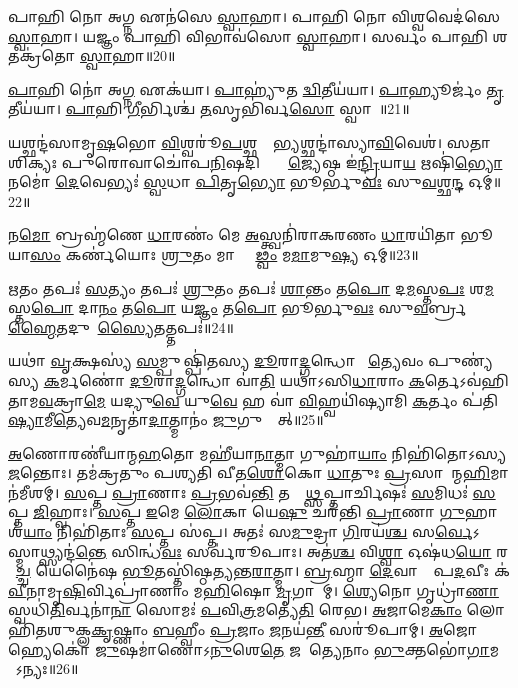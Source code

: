 𑌪𑌾𑌹𑌿 𑌨𑍋 𑌅𑌗𑍍𑌨 𑌏𑌨॑𑌸𑍇 \ul{𑌸𑍍𑌵𑌾}𑌹𑌾। 
𑌪𑌾𑌹𑌿 𑌨𑍋 𑌵𑌿𑌶𑍍𑌵𑌵𑍇𑌦॑𑌸𑍇 \ul{𑌸𑍍𑌵𑌾}𑌹𑌾। 
𑌯𑌜𑍍𑌞𑌂 𑌪𑌾𑌹𑌿 𑌵𑌿𑌭𑌾𑌵॑𑌸𑍋 \ul{𑌸𑍍𑌵𑌾}𑌹𑌾। 
𑌸𑌰𑍍𑌵𑌂 𑌪𑌾𑌹𑌿 𑌶𑌤𑌕𑍍𑌰॑𑌤𑍋 \ul{𑌸𑍍𑌵𑌾}𑌹𑌾॥20॥
\anuvakamend

\ul{𑌪𑌾}𑌹𑌿 𑌨𑍋॑ 𑌅\ul{𑌗𑍍𑌨} 𑌏𑌕॑𑌯𑌾। 
\ul{𑌪𑌾}𑌹𑍍𑌯𑍁॑𑌤 \ul{𑌦𑍍𑌵𑌿}𑌤𑍀𑌯॑𑌯𑌾। 
\ul{𑌪𑌾}𑌹𑍍𑌯𑍂𑌰𑍍𑌜𑌂॑ \ul{𑌤𑍃}𑌤𑍀𑌯॑𑌯𑌾। 
\ul{𑌪𑌾}𑌹𑌿 \ul{𑌗𑍀}𑌰𑍍𑌭𑌿𑌶𑍍𑌚॑ \ul{𑌤}𑌸𑍃𑌭𑌿॑𑌰𑍍𑌵\ul{𑌸𑍋} 𑌸𑍍𑌵𑌾𑌹𑌾᳚॥21॥
\anuvakamend

𑌯𑌶𑍍𑌛𑌨𑍍𑌦॑𑌸𑌾𑌮𑍃\ul{𑌷}𑌭𑍋 \ul{𑌵𑌿}𑌶𑍍𑌵𑌰𑍂॑\ul{𑌪}𑌶𑍍𑌛𑌨𑍍𑌦𑍋᳚\ul{𑌭𑍍𑌯}𑌶𑍍𑌛𑌨𑍍𑌦𑌾॑𑌸𑍍𑌯𑌾\ul{𑌵𑌿}𑌵𑍇𑌶॑। 
𑌸𑌤𑌾 𑌶𑌿𑌕𑍍𑌯𑌃 𑌪𑍁𑌰𑍋𑌵𑌾𑌚𑍋॑𑌪\ul{𑌨𑌿}𑌷𑌦𑌿𑌨𑍍𑌦𑍍𑌰𑍋᳚ \ul{𑌜𑍍𑌯𑍇}𑌷𑍍𑌠 𑌇॑\ul{𑌨𑍍𑌦𑍍𑌰𑌿}𑌯𑌾\ul{𑌯} 𑌋𑌷𑌿॑\ul{𑌭𑍍𑌯𑍋} 𑌨𑌮𑍋॑ \ul{𑌦𑍇}𑌵𑍇𑌭𑍍𑌯𑌃॑ \ul{𑌸𑍍𑌵}𑌧𑌾 \ul{𑌪𑌿}𑌤𑍃\ul{𑌭𑍍𑌯𑍋} 𑌭𑍂𑌰𑍍𑌭𑍁\ul{𑌵𑌃} 𑌸𑍁\ul{𑌵}𑌶𑍍𑌛\ul{𑌨𑍍𑌦} 𑌓𑌮𑍍॥22॥
\anuvakamend


𑌨\ul{𑌮𑍋} 𑌬𑍍𑌰𑌹𑍍𑌮॑𑌣𑍇 \ul{𑌧𑌾}𑌰𑌣𑌂॑ 𑌮𑍇 \ul{𑌅}𑌸𑍍𑌤𑍍𑌵𑌨𑌿॑𑌰𑌾𑌕𑌰𑌣𑌂 \ul{𑌧𑌾}𑌰𑌯𑌿॑𑌤𑌾 𑌭𑍂𑌯𑌾\ul{𑌸𑌂} 𑌕𑌰𑍍𑌣॑𑌯𑍋𑌃 \ul{𑌶𑍍𑌰𑍁}𑌤𑌂 𑌮𑌾 𑌚𑍍𑌯𑍋᳚\ul{𑌢𑍍𑌵𑌂} 𑌮\ul{𑌮𑌾}𑌮𑍁\ul{𑌷𑍍𑌯} 𑌓𑌮𑍍॥23॥
\anuvakamend

\ul{𑌋}𑌤𑌂 𑌤𑌪𑌃॑ \ul{𑌸}𑌤𑍍𑌯𑌂 𑌤𑌪𑌃॑ \ul{𑌶𑍍𑌰𑍁}𑌤𑌂 𑌤𑌪𑌃॑ \ul{𑌶𑌾}𑌨𑍍𑌤𑌂 𑌤\ul{𑌪𑍋} 𑌦\ul{𑌮}𑌸𑍍𑌤\ul{𑌪𑌃} 𑌶\ul{𑌮}𑌸𑍍𑌤\ul{𑌪𑍋} 𑌦𑌾\ul{𑌨𑌂} 𑌤\ul{𑌪𑍋} 𑌯\ul{𑌜𑍍𑌞𑌂} 𑌤\ul{𑌪𑍋} 𑌭𑍂𑌰𑍍𑌭𑍁\ul{𑌵𑌃} 𑌸𑍁\ul{𑌵}𑌰𑍍𑌬𑍍𑌰\ul{𑌹𑍍𑌮𑍈}𑌤𑌦𑍁𑌪𑌾᳚\ul{𑌸𑍍𑌯𑍈}𑌤𑌤𑍍𑌤𑌪𑌃॑॥24॥
\anuvakamend


𑌯𑌥𑌾॑ \ul{𑌵𑍃}𑌕𑍍𑌷𑌸𑍍𑌯॑ \ul{𑌸}𑌮𑍍𑌪𑍁𑌷𑍍𑌪𑌿॑𑌤𑌸𑍍𑌯 \ul{𑌦𑍂}𑌰𑌾\ul{𑌦𑍍𑌗}𑌨𑍍𑌧𑍋 𑌵𑌾᳚\ul{𑌤𑍍𑌯𑍇}𑌵𑌂 𑌪𑍁𑌣𑍍𑌯॑𑌸𑍍𑌯 \ul{𑌕}𑌰𑍍𑌮𑌣𑍋॑ \ul{𑌦𑍂}𑌰𑌾\ul{𑌦𑍍𑌗}𑌨𑍍𑌧𑍋 𑌵𑌾॑\ul{𑌤𑌿} 𑌯𑌥𑌾॑𑌽𑌸𑌿\ul{𑌧𑌾}𑌰𑌾𑌂 \ul{𑌕}𑌰𑍍𑌤𑍇𑌽𑌵॑𑌹𑌿𑌤𑌾𑌮\ul{𑌵}𑌕𑍍𑌰𑌾\ul{𑌮𑍇} 𑌯𑌦𑍍𑌯𑍁\ul{𑌵𑍇} 𑌯𑍁\ul{𑌵𑍇} 𑌹 𑌵𑌾॑ \ul{𑌵𑌿}𑌹𑍍𑌵𑌯𑌿॑𑌷𑍍𑌯𑌾𑌮𑌿 \ul{𑌕}𑌰𑍍𑌤𑌂 𑌪॑𑌤𑌿\ul{𑌷𑍍𑌯𑌾}𑌮𑍀\ul{𑌤𑍍𑌯𑍇}𑌵\ul{𑌮}𑌨𑍃𑌤𑌾॑\ul{𑌦𑌾}𑌤𑍍𑌮𑌾𑌨𑌂॑ \ul{𑌜𑍁}𑌗𑍁𑌫𑍍𑌸𑍇᳚𑌤𑍍॥25॥
\anuvakamend


\ul{𑌅}𑌣𑍋𑌰𑌣𑍀॑𑌯𑌾𑌨𑍍𑌮\ul{𑌹}𑌤𑍋 𑌮𑌹𑍀॑𑌯𑌾\ul{𑌨𑌾}𑌤𑍍𑌮𑌾 𑌗𑍁𑌹𑌾॑\ul{𑌯𑌾𑌂} 𑌨𑌿𑌹𑌿॑𑌤𑍋𑌽𑌸𑍍𑌯 \ul{𑌜}𑌨𑍍𑌤𑍋𑌃। 
𑌤𑌮॑𑌕𑍍𑌰𑌤𑍁𑌂 𑌪𑌶𑍍𑌯𑌤𑌿 𑌵𑍀𑌤\ul{𑌶𑍋}𑌕𑍋 \ul{𑌧𑌾}𑌤𑍁𑌃 \ul{𑌪𑍍𑌰}𑌸𑌾𑌦𑌾᳚𑌨𑍍𑌮\ul{𑌹𑌿}𑌮𑌾𑌨॑\-𑌮𑍀𑌶𑌮𑍍। 
\ul{𑌸}𑌪𑍍𑌤 \ul{𑌪𑍍𑌰𑌾}𑌣𑌾𑌃 \ul{𑌪𑍍𑌰}𑌭𑌵॑\ul{𑌨𑍍𑌤𑌿} 𑌤𑌸𑍍𑌮𑌾᳚\ul{𑌥𑍍𑌸}𑌪𑍍𑌤𑌾𑌰𑍍𑌚𑌿𑌷𑌃॑ \ul{𑌸}𑌮𑌿𑌧𑌃॑ \ul{𑌸}𑌪𑍍𑌤 \ul{𑌜𑌿}𑌹𑍍𑌵𑌾𑌃। 
\ul{𑌸}𑌪𑍍𑌤 \ul{𑌇}𑌮𑍇 \ul{𑌲𑍋}𑌕𑌾 𑌯𑍇\ul{𑌷𑍁} 𑌚𑌰॑𑌨𑍍𑌤𑌿 \ul{𑌪𑍍𑌰𑌾}𑌣𑌾 \ul{𑌗𑍁}𑌹𑌾𑌶॑\ul{𑌯𑌾𑌂} 𑌨𑌿𑌹𑌿॑𑌤𑌾𑌃 \ul{𑌸}𑌪𑍍𑌤 𑌸॑𑌪𑍍𑌤। 
𑌅𑌤𑌃॑ 𑌸\ul{𑌮𑍁}𑌦𑍍𑌰𑌾 \ul{𑌗𑌿}𑌰𑌯॑\ul{𑌶𑍍𑌚} 𑌸\ul{𑌰𑍍𑌵𑍇}𑌽𑌸𑍍𑌮𑌾𑌥𑍍𑌸𑍍𑌯𑌨𑍍𑌦॑\ul{𑌨𑍍𑌤𑍇} 𑌸𑌿𑌨𑍍𑌧॑\ul{𑌵𑌃} 𑌸𑌰𑍍𑌵॑𑌰𑍂𑌪𑌾𑌃। 
𑌅𑌤॑\ul{𑌶𑍍𑌚} 𑌵𑌿\ul{𑌶𑍍𑌵𑌾} 𑌓𑌷॑𑌧\ul{𑌯𑍋} 𑌰𑌸𑌾᳚\ul{𑌚𑍍𑌚} 𑌯𑍇𑌨𑍈॑𑌷 \ul{𑌭𑍂}𑌤𑌸𑍍𑌤𑌿॑𑌷𑍍𑌠𑌤𑍍𑌯𑌨𑍍𑌤\ul{𑌰𑌾}𑌤𑍍𑌮𑌾। 
\ul{𑌬𑍍𑌰}𑌹𑍍𑌮𑌾 \ul{𑌦𑍇}𑌵𑌾𑌨𑌾𑌂᳚ 𑌪\ul{𑌦}𑌵𑍀𑌃 𑌕॑\ul{𑌵𑍀}𑌨𑌾𑌮𑍃\ul{𑌷𑌿}𑌰𑍍𑌵𑌿𑌪𑍍𑌰𑌾॑𑌣𑌾𑌂 𑌮\ul{𑌹𑌿}𑌷𑍋 \ul{𑌮𑍃}𑌗𑌾𑌣𑌾᳚𑌮𑍍। 
\ul{𑌶𑍍𑌯𑍇}𑌨𑍋 𑌗𑍃𑌧𑍍𑌰𑌾॑\ul{𑌣𑌾}\ul{} 𑌸𑍍𑌵𑌧𑌿॑\ul{𑌤𑌿}𑌰𑍍𑌵𑌨𑌾॑\ul{𑌨𑌾}\ul{} 𑌸𑍋𑌮𑌃॑ \ul{𑌪}𑌵𑌿\ul{𑌤𑍍𑌰}𑌮𑌤𑍍𑌯𑍇॑\ul{𑌤𑌿} 𑌰𑍇𑌭\sn{}। 
\ul{𑌅}𑌜𑌾𑌮𑍇\ul{𑌕𑌾𑌂} 𑌲𑍋𑌹𑌿॑𑌤𑌶𑍁𑌕𑍍𑌲\ul{𑌕𑍃}𑌷𑍍𑌣𑌾𑌂 \ul{𑌬}𑌹𑍍𑌵𑍀𑌂 \ul{𑌪𑍍𑌰}𑌜𑌾𑌂 \ul{𑌜}𑌨𑌯॑\ul{𑌨𑍍𑌤𑍀}\ul{} 𑌸𑌰𑍂॑𑌪𑌾𑌮𑍍। 
\ul{𑌅}𑌜𑍋 𑌹𑍍𑌯𑍇𑌕𑍋॑ \ul{𑌜𑍁}𑌷𑌮𑌾॑𑌣𑍋𑌽\ul{𑌨𑍁}𑌶𑍇\ul{𑌤𑍇} 𑌜𑌹𑌾᳚𑌤𑍍𑌯𑍇𑌨𑌾𑌂 \ul{𑌭𑍁}𑌕𑍍𑌤𑌭𑍋॑\ul{𑌗𑌾}𑌮𑌜𑍋᳚𑌽𑌨𑍍𑌯𑌃॥26॥

